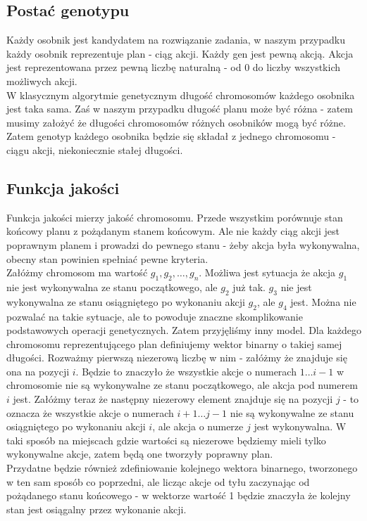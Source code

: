 \documentclass{article}
\begin{document}
\subsection{Postać genotypu}
Każdy osobnik jest kandydatem na rozwiązanie zadania, w naszym przypadku każdy osobnik reprezentuje plan - ciąg akcji. Każdy gen jest pewną akcją. Akcja jest reprezentowana przez pewną liczbę naturalną - od 0 do liczby wszystkich możliwych akcji. \\
W klasycznym algorytmie genetycznym długość chromosomów każdego osobnika jest taka sama. Zaś w naszym przypadku długość planu może być różna - zatem musimy założyć że długości chromosomów różnych osobników mogą być różne. \\
Zatem genotyp każdego osobnika będzie się składał z jednego chromosomu - ciągu akcji, niekoniecznie stałej długości.
\subsection{Funkcja jakości}
Funkcja jakości mierzy jakość chromosomu. Przede wszystkim porównuje stan końcowy planu z pożądanym stanem końcowym. Ale nie każdy ciąg akcji jest poprawnym planem i prowadzi do pewnego stanu - żeby akcja była wykonywalna, obecny stan powinien spełniać pewne kryteria. \\
Załóżmy chromosom ma wartość $g_1, g_2, \dots , g_n$. Możliwa jest sytuacja że akcja $g_1$ nie jest wykonywalna ze stanu początkowego, ale $g_2$ już tak. $g_3$ nie jest wykonywalna ze stanu osiągniętego po wykonaniu akcji $g_2$, ale $g_4$ jest. Można nie pozwalać na takie sytuacje, ale to powoduje znaczne skomplikowanie podstawowych operacji genetycznych. Zatem przyjęliśmy inny model.
Dla każdego chromosomu reprezentującego plan definiujemy wektor binarny o takiej samej długości. Rozważmy pierwszą niezerową liczbę w nim - załóżmy że znajduje się ona na pozycji $i$. Będzie to znaczyło że wszystkie akcje o numerach $1 \dots i-1$ w chromosomie nie są wykonywalne ze stanu początkowego, ale akcja pod numerem $i$ jest. Załóżmy teraz że następny niezerowy element znajduje się na pozycji $j$ - to oznacza że wszystkie akcje o numerach $i+1 \dots j-1$ nie są wykonywalne ze stanu osiągniętego po wykonaniu akcji $i$, ale akcja o numerze $j$ jest wykonywalna. W taki sposób na miejscach gdzie wartości są niezerowe będziemy mieli tylko wykonywalne akcje, zatem będą one tworzyły poprawny plan. \\
Przydatne będzie również zdefiniowanie kolejnego wektora binarnego, tworzonego w ten sam sposób co poprzedni, ale licząc akcje od tyłu zaczynając od pożądanego stanu końcowego - w wektorze wartość 1 będzie znaczyła że kolejny stan jest osiągalny przez wykonanie akcji. \\
\end{document}
